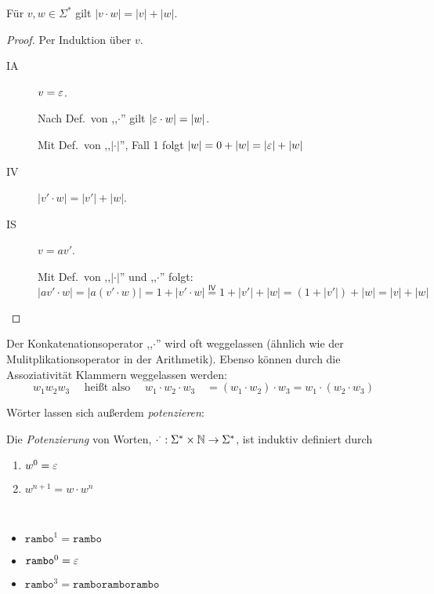 \begin{lemma}
  Für $v,w \in \Sigma^*$ gilt $|v\cdot w| = |v| + |w|$.
\end{lemma}
\begin{proof}
  Per Induktion über $v$.
  \begin{description}
  \item[IA] $v = \varepsilon$.

    Nach Def.\ von ,,$\cdot$'' gilt $|\varepsilon \cdot w| = |w|$.

    Mit Def.\ von ,,$|\cdot|$'', Fall 1 folgt $|w| = 0 + |w| = |\varepsilon| + |w|$
 \item[IV] $|v' \cdot w| = |v'| + |w|$.
 \item[IS] $v = av'$.

   Mit Def.\ von ,,$|\cdot|$'' und ,,$\cdot$'' folgt:
   \begin{displaymath}
   |av'\cdot w| = |a(v'\cdot w)| = 1 + |v' \cdot w| \stackrel{\mathsf{IV}}{=} 1 + |v'| + |w| = (1 + |v'|) + |w| = |v| + |w|
   \end{displaymath}
  
  \end{description}
\end{proof}

Der Konkatenationsoperator ,,$\cdot$'' wird oft weggelassen (ähnlich wie der Mulitplikationsoperator in der Arithmetik).
Ebenso können durch die Assoziativität Klammern weggelassen werden:
\begin{displaymath}
  w_1w_2w_3 \quad \text{ heißt also } \quad w_1\cdot w_2\cdot w_3 \quad = (w_1 \cdot w_2) \cdot w_3 = w_1 \cdot (w_2 \cdot w_3)
\end{displaymath}

Wörter lassen sich außerdem \emph{potenzieren}:
\begin{Def}
  Die \emph{Potenzierung} von Worten, $\cdot ^ \cdot: \Sigma^*\times \mathbb{N} \to \Sigma^*$, ist induktiv definiert durch
  \begin{enumerate}
  \item $w^0 = \varepsilon$ 
  \item $w^{n+1} = w \cdot w^n$
  \end{enumerate}
\end{Def}
\begin{Bsp*} ~
  \begin{itemize}
  \item $\mathtt{rambo}^1 = \mathtt{rambo}$
  \item $\mathtt{rambo}^0 = \varepsilon$
  \item $\mathtt{rambo}^3 = \mathtt{ramboramborambo}$
  \end{itemize}
\end{Bsp*}

